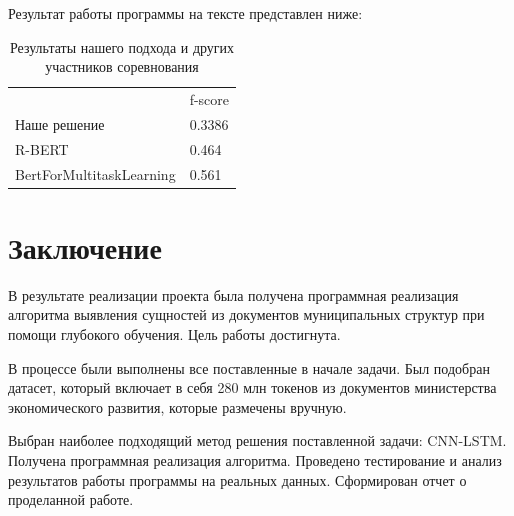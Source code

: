 \documentclass{article}
\begin{document}
Результат работы программы на тексте представлен ниже: 

\begin{table}[tbh!]
    \centering
    \begin{tabular}[t]{l|l}
         &  f-score\\
        Наше решение & 0.3386\\
        R-BERT & 0.464 \\
        BertForMultitaskLearning & 0.561 \\
    \end{tabular}
    \caption{Результаты нашего подхода и других участников соревнования}
    \label{tab:результаты нашего подхода и других участников соревнования}
\end{table}


\section{Заключение}
В результате реализации проекта была получена программная реализация алгоритма выявления сущностей из документов муниципальных структур при помощи глубокого обучения. Цель работы достигнута. 

В процессе были выполнены все поставленные в начале задачи.  Был подобран датасет, который включает в себя 280 млн токенов из документов министерства экономического развития, которые размечены вручную.

 Выбран наиболее подходящий метод решения поставленной задачи: CNN-LSTM.
Получена программная реализация алгоритма. Проведено тестирование и анализ результатов работы программы на реальных данных. Сформирован отчет о проделанной работе.


\end{document}
